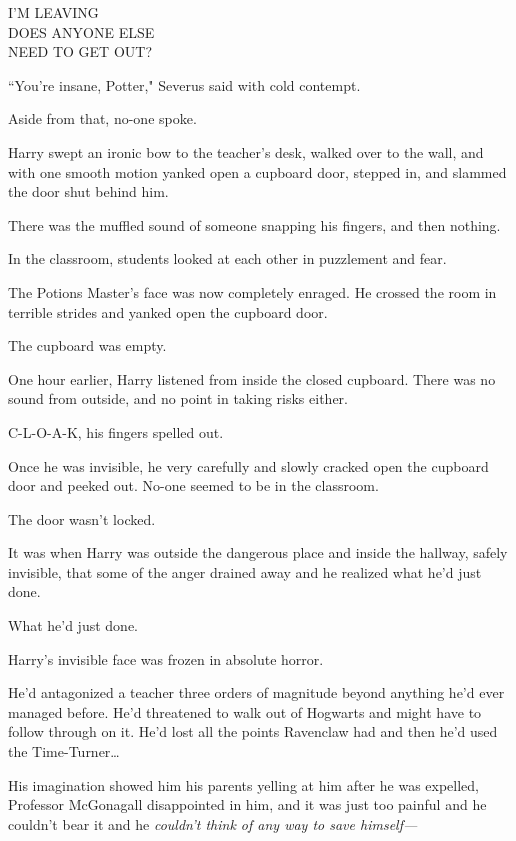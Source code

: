 \begin{writtenNote}
I'M LEAVING\\
DOES ANYONE ELSE\\
NEED TO GET OUT?
\end{writtenNote}

``You're insane, Potter," Severus said with cold contempt.

Aside from that, no-one spoke.

Harry swept an ironic bow to the teacher's desk, walked over to the wall, and with one smooth motion yanked open a cupboard door, stepped in, and slammed the door shut behind him.

There was the muffled sound of someone snapping his fingers, and then nothing.

In the classroom, students looked at each other in puzzlement and fear.

The Potions Master's face was now completely enraged. He crossed the room in terrible strides and yanked open the cupboard door.

The cupboard was empty.

\later

One hour earlier, Harry listened from inside the closed cupboard. There was no sound from outside, and no point in taking risks either.

C-L-O-A-K, his fingers spelled out.

Once he was invisible, he very carefully and slowly cracked open the cupboard door and peeked out. No-one seemed to be in the classroom.

The door wasn't locked.

It was when Harry was outside the dangerous place and inside the hallway, safely invisible, that some of the anger drained away and he realized what he'd just done.

What he'd just done.

Harry's invisible face was frozen in absolute horror.

He'd antagonized a teacher three orders of magnitude beyond anything he'd ever managed before. He'd threatened to walk out of Hogwarts and might have to follow through on it. He'd lost all the points Ravenclaw had and then he'd used the Time-Turner{\ldots}

His imagination showed him his parents yelling at him after he was expelled, Professor McGonagall disappointed in him, and it was just too painful and he couldn't bear it and he \emph{couldn't think of any way to save himself—}

